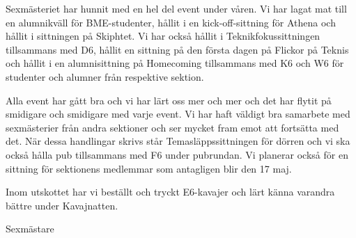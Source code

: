 \documentclass[../_main/handlingar.tex]{subfiles}
\begin{document}
Sexmästeriet har hunnit med en hel del event under våren. Vi har lagat mat till en alumnikväll för BME-studenter, hållit i en kick-off-sittning för Athena och hållit i sittningen på Skiphtet. Vi har också hållit i Teknikfokussittningen tillsammans med D6, hållit en sittning på den första dagen på Flickor på Teknis och hållit i en alumnisittning på Homecoming tillsammans med K6 och W6 för studenter och alumner från respektive sektion.

 Alla event har gått bra och vi har lärt oss mer och mer och det har flytit på smidigare och smidigare med varje event. Vi har haft väldigt bra samarbete med sexmästerier från andra sektioner och ser mycket fram emot att fortsätta med det. När dessa handlingar skrivs står Temasläppssittningen för dörren  och vi ska också hålla pub tillsammans med F6 under pubrundan. Vi planerar också för en sittning för sektionens medlemmar som antagligen blir den 17 maj.

Inom utskottet har vi beställt och tryckt E6-kavajer och lärt känna varandra bättre under Kavajnatten.
\begin{signatures}{1}
    \mvh
    \signature{Alexander Wik}{Sexmästare}
\end{signatures}
\end{document}
